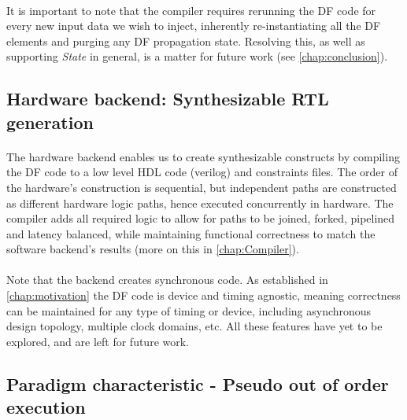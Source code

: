 \paragraph{}It is important to note that the \cf compiler requires rerunning the DF code for every new input data we wish to inject, inherently re-instantiating all the DF elements and purging any DF propagation state. Resolving this, as well as supporting \textit{State} in general, is a matter for future work (see \autoref{chap:conclusion}).

\subsection{Hardware backend: Synthesizable RTL generation}
\label{subsec:hardware_backend}
\paragraph{}The hardware backend enables us to create synthesizable constructs by compiling the DF code to a low level HDL code (verilog) and constraints files. The order of the hardware's construction is sequential, but independent paths are constructed as different hardware logic paths, hence executed concurrently in hardware. The compiler adds all required logic to allow for paths to be joined, forked, pipelined and latency balanced, while maintaining functional correctness to match the software backend's results (more on this in \autoref{chap:Compiler}). 

\paragraph{}Note that the backend creates synchronous code. As established in \autoref{chap:motivation} the DF code is device and timing agnostic, meaning correctness can be maintained for any type of timing or device, including asynchronous design topology, multiple clock domains, etc. All these features have yet to be explored, and are left for future work.

\subsection{Paradigm characteristic - Pseudo out of order execution}
